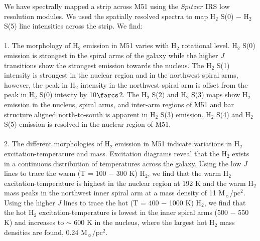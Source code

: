 \documentclass[manuscript]{aastex}
\begin{document}
We have spectrally mapped a strip across M51 using the $Spitzer$ IRS low resolution modules.  We used the spatially resolved spectra to map $\mathrm{H_2}$ S(0) $-$ $\mathrm{H_2}$ S(5) line intensities across the strip.  We find:\\
\\
1.  The morphology of $\mathrm{H_2}$ emission in M51 varies with $\mathrm{H_2}$ rotational level.  $\mathrm{H_2}$ S(0) emission is strongest in the spiral arms of the galaxy while the higher $J$ transitions show the strongest emission towards the nucleus.  The $\mathrm{H_2}$ S(1) intensity is strongest in the nuclear region and in the northwest spiral arms, however, the peak in $\mathrm{H_2}$ intensity in the northwest spiral arm is offset from the peak in $\mathrm{H_2}$ S(0) intesity by 10$\farcs$2.  The $\mathrm{H_2}$ S(2) and $\mathrm{H_2}$ S(3) maps show $\mathrm{H_2}$ emission in the nucleus, spiral arms, and inter-arm regions of M51 and bar structure aligned north-to-south is apparent in $\mathrm{H_2}$ S(3) emission.  $\mathrm{H_2}$ S(4) and $\mathrm{H_2}$ S(5) emission is resolved in the nuclear region of M51.\\  
\\
2.  The different morphologies of  $\mathrm{H_2}$ emission in M51 indicate variations in $\mathrm{H_2}$ excitation-temperature and mass.  
Excitation diagrams reveal that the $\mathrm{H_2}$ exists in a continuous distribution of temperatures across the galaxy.  
Using the low $J$ lines to trace the warm (T = 100 $-$ 300 K) $\mathrm{H_2}$, we find that the warm  $\mathrm{H_2}$ excitation-temperature is highest in the nuclear region at 192 K and the warm $\mathrm{H_2}$ mass peaks in the northwest inner spiral arm at a mass density of 11 $\mathrm{M_\sun}$/$\mathrm{pc^2}$.  Using the higher $J$ lines to trace the hot (T = 400 $-$ 1000 K)  $\mathrm{H_2}$, we find that the hot $\mathrm{H_2}$ excitation-temperature is lowest in the inner spiral arms (500 $-$ 550 K) and increases to $\sim$ 600 K in the nucleus, where the largest hot $\mathrm{H_2}$ mass densities are found, 0.24 $\mathrm{M_\sun}$/$\mathrm{pc^2}$.\\
\end{document}
